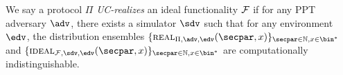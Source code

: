 \begin{definition}
    We say a protocol $\Pi$ \emph{UC-realizes} an ideal functionality $\mathcal{F}$ if for any PPT adversary $\adv$, there exists a simulator $\Sim$ such that for any environment $\env$, the distribution ensembles $\{ \real_{\Pi,\adv,\env}(\secpar, x) \}_{\secpar \in \mathbb{N}, x \in \bin^*}$ and $\{ \ideal_{\F,\Sim,\env}(\secpar,\allowbreak x) \}_{\secpar \in \mathbb{N},x \in \bin^*}$ are computationally indistinguishable.
\end{definition}
